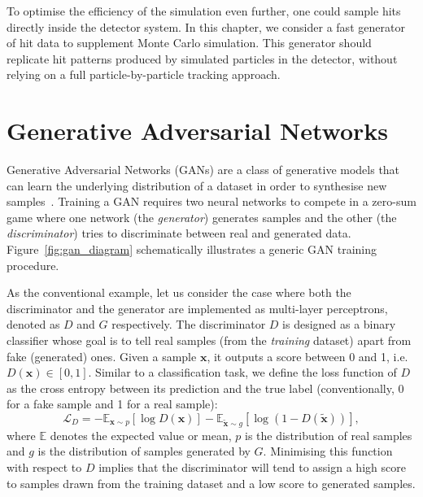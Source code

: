 To optimise the efficiency of the simulation even further,
one could sample hits directly inside the detector system. In this chapter, we
consider a fast generator of hit data to supplement Monte Carlo simulation.
This generator should replicate hit patterns produced by simulated particles in
the detector, without relying on a full particle-by-particle tracking approach.



\section{Generative Adversarial Networks}
Generative Adversarial Networks (GANs) are a class of generative models that can
learn the underlying distribution of a dataset in order to synthesise new
samples~\cite{goodfellow_generative_2014}. Training a GAN requires two neural
networks to compete in a zero-sum game where one network (the \emph{generator})
generates samples and the other (the \emph{discriminator}) tries to discriminate
between real and generated data. Figure~\ref{fig:gan_diagram} schematically
illustrates a generic GAN training procedure.


As the conventional example, let us consider the case where both the
discriminator and the generator are implemented as multi-layer perceptrons,
denoted as $D$ and $G$ respectively. 
The discriminator $D$ is designed as a binary classifier whose goal is to tell
real samples (from the \emph{training} dataset) apart from fake (generated)
ones. Given a sample $\bm{x}$, it outputs a score between 0 and 1, i.e.\ 
$D(\bm{x}) \in [0, 1]$. Similar to a classification task, we define the loss
function of $D$ as the cross entropy between its prediction and the true label
(conventionally, 0 for a fake sample and 1 for a real sample):
\begin{equation}\label{eq:D_loss}
    \mathcal{L}_D =
    -\mathbb{E}_{\bm{x} \sim p} [ \log D(\bm{x}) ] -
    \mathbb{E}_{\tilde{\bm{x}} \sim g} [ \log( 1 - D(\tilde{\bm{x}}) )],
\end{equation}
where $\mathbb{E}$ denotes the expected value or mean, $p$ is the distribution
of real samples and $g$ is the distribution of samples generated by $G$.
Minimising this function with respect to $D$ implies that the discriminator will
tend to assign a high score to samples drawn from the training dataset and a low
score to generated samples.



